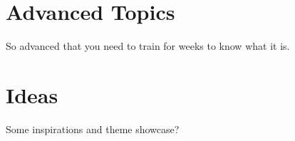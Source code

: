 \documentclass[
]{book}
\begin{document}
\hypertarget{advanced}{%
\chapter{Advanced Topics}\label{advanced}}

So advanced that you need to train for weeks to know what it is.

\hypertarget{ideas}{%
\chapter{Ideas}\label{ideas}}

Some inspirations and theme showcase?

  

\backmatter
\printindex
\end{document}
